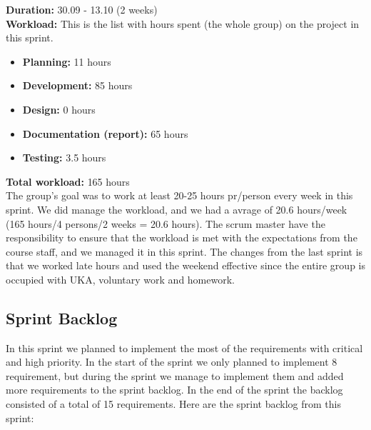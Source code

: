 	{\bf Duration:} 30.09 - 13.10 (2 weeks)\\
	{\bf Workload:} This is the list with hours spent (the whole group) on the project in this sprint.
	\begin{itemize}
		\item {\bf Planning:} 11 hours
		\item {\bf Development:} 85 hours
		\item {\bf Design:} 0 hours
		\item {\bf Documentation (report):} 65 hours
		\item {\bf Testing:} 3.5 hours
	\end{itemize}
	{\bf Total workload: } 165 hours \\

	The group's goal was to work at least 20-25 hours pr/person every week in this sprint. 
	We did manage the workload, and we had a avrage of 20.6 hours/week (165 hours/4 persons/2 weeks = 20.6 hours). 
	The scrum master have the responsibility to ensure that the workload is met with the
	expectations from the course staff, and we managed it in this sprint.
	The changes from the last sprint is that we worked late hours and used the weekend effective
	since the entire group is occupied with UKA, voluntary work and homework.

\subsection{Sprint Backlog}

	In this sprint we planned to implement the most of the requirements with critical and high
	priority. In the start of the sprint we only planned to implement 8 requirement, but
	during the sprint we manage to implement them and added more requirements to the sprint backlog.
	In the end of the sprint the backlog consisted of a total of 15 requirements. Here are the
	sprint backlog from this sprint:

